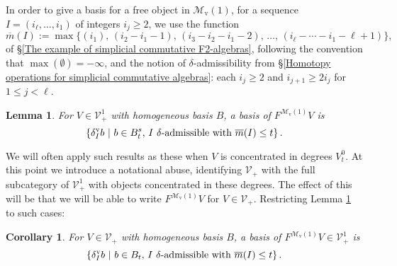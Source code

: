 \documentclass[11pt]{amsart} \renewcommand{\baselinestretch}{1.2}
\theoremstyle{plain}
\newtheorem{lem}[thm]{Lemma}
\newtheorem{cor}[thm]{Corollary}
\numberwithin{equation}{section} %
\theoremstyle{plain}
\newtheorem{lem}[thm]{Lemma}
\newtheorem{cor}[thm]{Corollary}
\numberwithin{equation}{chapter} %
\newcommand{\calV}{\mathcal{V}}
\newcommand{\calMv}{\mathcal{M}\dver}
\newcommand{\vect}[2]{\calV^{#1}_{#2}}
\newcommand{\minDimP}{\overline{m}}
\newcommand{\uver}{^\mathrm{v}}
\newcommand{\dver}{_\mathrm{v}}
\newcommand{\deltav}{\delta\uver}
\begin{document}
\begin{Cohomology Operations for W and U}
In order to give a basis for a free object in $\calMv(1)$, for a sequence $I=(i_\ell,\ldots,i_1)$ of integers $i_j\geq2$, we use the function
\[\minDimP(I):=\max\{(i_1),\,(i_2-i_1-1),\,(i_3-i_2-i_1-2),\,\ldots,\,(i_{\ell}-\cdots-i_1-\ell+1)\},
\]
of \S\ref{The example of simplicial commutative F2-algebras},
following the convention that $\max(\emptyset)=-\infty$, and the notion of  $\delta$-admissibility from \S\ref{Homotopy operations for simplicial commutative algebras}: each $i_j\geq2$ and  $i_{j+1}\geq 2i_j$ for $1\leq j <\ell$.
\begin{lem}
\label{basis of element of M(0)}
For $V\in\vect{1}{+}$ with homogeneous basis $B$, a basis of $F^{\calMv(1)}V$ is
\[\left\{\deltav_Ib\ \middle|\ b\in B^{s}_t\textup{, $I$ $\delta$-admissible with }\minDimP(I)\leq t\right\}.\]
\end{lem}
We will often apply such results as these when $V$ is concentrated in degrees $V_t^0$. At this point we introduce a notational abuse, identifying $\vect{}{+}$ with  the full subcategory of $\vect{1}{+}$ with objects concentrated in these degrees. The effect of this will be that we will be able to write $F^{\calMv(1)}V$ for $V\in \vect{}{+}$. Restricting Lemma \ref{basis of element of M(0)} to such cases:
\begin{cor}
\label{basis of element of M(0) in deg 0}
For $V\in\vect{}{+}$ with homogeneous basis $B$, a basis of $F^{\calMv(1)}V\in\vect{1}{+}$ is
\[\left\{\deltav_Ib\ \middle|\ b\in B_t\textup{, $I$ $\delta$-admissible with }\minDimP(I)\leq t\right\}.\]
\end{cor}



\end{Cohomology Operations for W and U}
\end{document}
